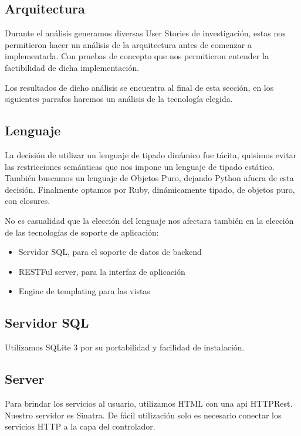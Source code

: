 \subsection{Arquitectura} %
\label{sub:Arquitectura}

Durante el an\'alisis generamos diversas User Stories de investigaci\'on, estas nos permitieron hacer un an\'alisis de la arquitectura antes de comenzar a implementarla.
Con pruebas de concepto que nos permitieron entender la factibilidad de dicha implementaci\'on.

Los resultados de dicho an\'alisis se encuentra al final de esta secci\'on, en los siguientes parrafos haremos un an\'alisis de la tecnolog\'ia elegida.

\subsection{Lenguaje}
La decisi\'on de utilizar un lenguaje de tipado din\'amico fue t\'acita, quisimos evitar las restricciones sem\'anticas que nos impone un lenguaje de tipado est\'atico.  
Tambi\'en buscamos un lenguaje de Objetos Puro, dejando Python afuera de esta decisi\'on.  
Finalmente optamos por Ruby, din\'amicamente tipado, de objetos puro, con closures.


No es casualidad que la elecci\'on del lenguaje nos afectara tambi\'en en la elecci\'on de las tecnolog\'ias de soporte de aplicaci\'on:
\begin{itemize}
    \item Servidor SQL, para el soporte de datos de backend
    \item RESTFul server, para la interfaz de aplicaci\'on
    \item Engine de templating para las vistas
\end{itemize}

\subsection{Servidor SQL}
Utilizamos SQLite 3 por su portabilidad y facilidad de instalaci\'on.

\subsection{Server}

Para brindar los servicios al usuario, utilizamos HTML con una api HTTPRest. Nuestro servidor es Sinatra. De f\'acil utilizaci\'on solo es necesario conectar los servicios HTTP a la capa del controlador.


